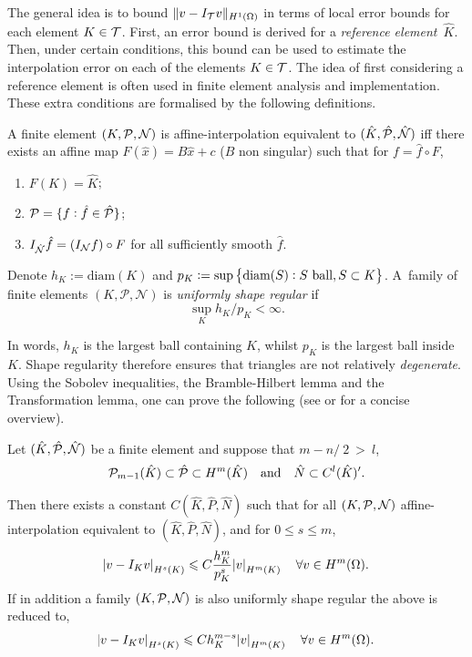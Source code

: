 \documentclass[thesis.tex]{subfiles}
\begin{document}
  The general idea is to bound $\|v - I_{\mathcal{T}} v\|_{H^1(\O)}$ 
  in terms of local error bounds for each element $K \in \T$.
  First, an error bound is derived for a \emph{reference element}~$\hat K$. 
  Then, under certain conditions, this bound can be used to estimate the interpolation error 
  on each of the elements $K \in \T$. The idea of first considering a reference element is often 
  used in finite element analysis and implementation. These extra conditions are formalised by the following definitions.
  \begin{defn}
    A finite element $(K, \P, \N)$ is affine-interpolation equivalent to $(\hat K, \hat \P, \hat \N)$ iff there
    exists an affine map $ F(\hat x) = B\hat x + c$ ($B$ non singular) such that for $f = \hat f \circ F$,
    \begin{enumerate}[label=(\roman*)]
      \item $F(K) = \hat K$;
      \item $\P = \{f : \hat f \in \hat \P\}$;
    \item $I_{\hat \N} \hat f = \left( I_{\N} f \right)\circ F$ for all sufficiently smooth $\hat f$.
    \end{enumerate}
  \end{defn}
  \begin{defn}
    Denote $h_K := \text{diam}(K)$ and $p_K := \sup\set{\text{diam}(S): S \text{ ball}, S \subset K}$.
    A~family of finite elements $(K, \mathcal{P}, \mathcal{N})$ is \emph{uniformly shape regular} if 
    \[
      \sup_K h_K/p_K < \infty.
    \]
  \end{defn}
  In words,  $h_K$ is the largest ball containing $K$, whilst $p_K$ is the largest ball inside $K$.
  Shape regularity therefore ensures that triangles are not relatively \emph{degenerate}.  
  Using the Sobolev inequalities, the Bramble-Hilbert lemma and the Transformation lemma, one
  can prove the following (see \cite[Ch~3]{chen} or \cite{stevenson} for a concise overview).
  \begin{thm}
    Let $(\hat K, \hat \P, \hat \N)$ be a finite element and suppose that $m - n/~2~>~l$,
    \[
      \P_{m-1}(\hat K) \subset \hat \P \subset H^m(\hat K) \quad \text{and} \quad \hat N \subset  C^l(\hat K)'.
    \]
    
    Then there exists a constant $C(\hat K, \hat P, \hat N)$ such that for all $(K, \P, \N)$ affine-interpolation
      equivalent to $(\hat K, \hat P, \hat N)$, and for $0 \leq s \leq m$,
      \[
        \abs{v - I_K v}_{H^s(K)} \leq C \frac{h_K^{m}}{p_K^s} \abs{v}_{H^m(K)} \quad  \forall v \in H^m(\O).
      \]
      If in addition a family $(K, \P, \N)$ is also uniformly shape regular the above is reduced to,
      \[
        \abs{v - I_K v}_{H^s(K)} \leq C h_K^{m -s} \abs{v}_{H^m(K)} \quad \forall v \in H^m(\O).
      \]
  \end{thm}
\end{document}
